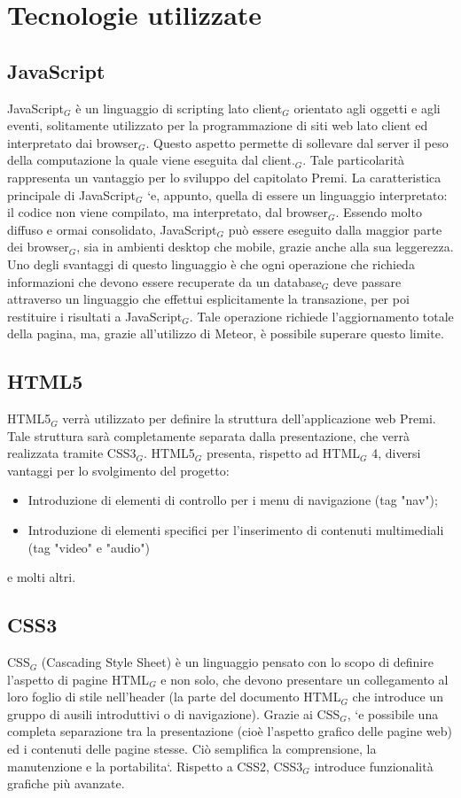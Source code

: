 \section{Tecnologie utilizzate}

\subsection{JavaScript}

JavaScript$_G$ è un linguaggio di scripting lato client$_G$ orientato agli oggetti e agli eventi, solitamente utilizzato per la programmazione di siti web lato client ed interpretato dai browser$_G$. Questo aspetto permette di sollevare dal server il peso della computazione la quale viene eseguita dal client.$_G$. Tale particolarità rappresenta un vantaggio per lo sviluppo del capitolato Premi. La caratteristica principale di JavaScript$_G$ `e, appunto, quella di essere un linguaggio interpretato: il codice non viene compilato, ma interpretato, dal browser$_G$. Essendo molto diffuso e ormai consolidato, JavaScript$_G$ può essere eseguito dalla maggior parte dei browser$_G$, sia in ambienti desktop che mobile, grazie anche alla sua leggerezza. Uno degli svantaggi di questo linguaggio è che ogni operazione che richieda informazioni che devono essere recuperate da un database$_G$ deve passare attraverso un linguaggio che effettui esplicitamente la transazione, per poi restituire i risultati a JavaScript$_G$. Tale operazione richiede l'aggiornamento totale della pagina, ma, grazie all'utilizzo di Meteor, è possibile superare questo limite.

\subsection{HTML5}

HTML5$_G$ verrà utilizzato per definire la struttura dell'applicazione web Premi. Tale struttura sarà completamente separata dalla presentazione, che verrà realizzata tramite CSS3$_G$. HTML5$_G$ presenta, rispetto ad HTML$_G$ 4, diversi vantaggi per lo svolgimento del progetto:
\begin{itemize}
\item Introduzione di elementi di controllo per i menu di navigazione (tag "nav");
\item Introduzione di elementi specifici per l'inserimento di contenuti multimediali (tag "video" e "audio")
\end{itemize}
e molti altri.

\subsection{CSS3}
CSS$_G$ (Cascading Style Sheet) è un linguaggio pensato con lo scopo di definire l'aspetto di pagine HTML$_G$ e non solo, che devono presentare un collegamento al loro foglio di stile nell'header (la parte del documento HTML$_G$ che introduce un gruppo di ausili introduttivi o di navigazione). Grazie ai CSS$_G$, `e possibile una completa separazione tra la presentazione (cioè l'aspetto grafico delle pagine web) ed i contenuti delle pagine stesse. Ciò semplifica la comprensione, la manutenzione e la portabilita`. Rispetto a CSS2, CSS3$_G$ introduce funzionalità grafiche più avanzate.

